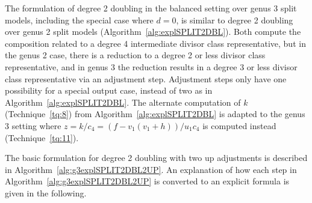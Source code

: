 The formulation of degree 2 doubling in the balanced setting over genus 3 split
models, including the special case where $d=0$, is similar to degree 2
doubling over genus 2 split models (Algorithm~\ref{alg:explSPLIT2DBL}). Both compute
the composition related to a degree 4 intermediate divisor class representative,
but in the genus 2 case, there is a reduction to a degree 2 or less divisor
class representative, and in genus 3 the reduction results in a degree 3 or less
divisor class representative via an adjustment step. Adjustment steps only have
one possibility for a special output case, instead of two as in
Algorithm~\ref{alg:explSPLIT2DBL}. The alternate computation of $k$
(Technique~\ref{tq:8}) from Algorithm~\ref{alg:explSPLIT2DBL} is adapted to the
genus 3 setting where $z = k/c_4 = (f - v_1(v_1 + h))/u_1c_4$ is computed
instead (Technique~\ref{tq:11}).

The basic formulation for degree 2 doubling with two up adjustments is described in
Algorithm~\ref{alg:g3explSPLIT2DBL2UP}. An explanation of how each step in
Algorithm~\ref{alg:g3explSPLIT2DBL2UP} is converted to an explicit formula is given
in the following.

